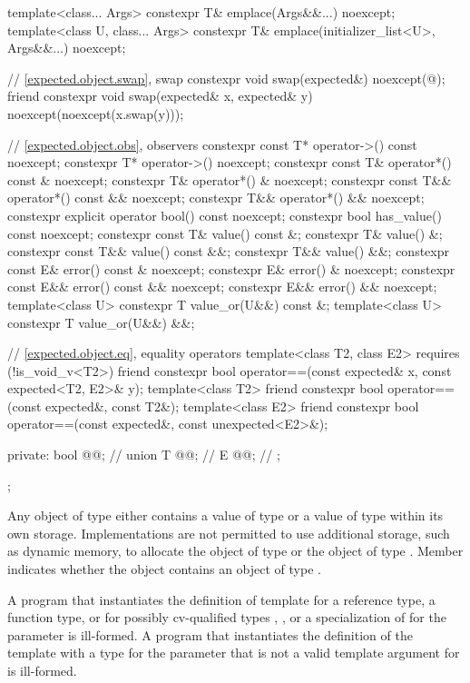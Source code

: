 \begin{codeblock}
{{    template<class... Args>
      constexpr T& emplace(Args&&...) noexcept;
    template<class U, class... Args>
      constexpr T& emplace(initializer_list<U>, Args&&...) noexcept;

    // \ref{expected.object.swap}, swap
    constexpr void swap(expected&) noexcept(@\seebelow@);
    friend constexpr void swap(expected& x, expected& y) noexcept(noexcept(x.swap(y)));

    // \ref{expected.object.obs}, observers
    constexpr const T* operator->() const noexcept;
    constexpr T* operator->() noexcept;
    constexpr const T& operator*() const & noexcept;
    constexpr T& operator*() & noexcept;
    constexpr const T&& operator*() const && noexcept;
    constexpr T&& operator*() && noexcept;
    constexpr explicit operator bool() const noexcept;
    constexpr bool has_value() const noexcept;
    constexpr const T& value() const &;
    constexpr T& value() &;
    constexpr const T&& value() const &&;
    constexpr T&& value() &&;
    constexpr const E& error() const & noexcept;
    constexpr E& error() & noexcept;
    constexpr const E&& error() const && noexcept;
    constexpr E&& error() && noexcept;
    template<class U> constexpr T value_or(U&&) const &;
    template<class U> constexpr T value_or(U&&) &&;

    // \ref{expected.object.eq}, equality operators
    template<class T2, class E2> requires (!is_void_v<T2>)
      friend constexpr bool operator==(const expected& x, const expected<T2, E2>& y);
    template<class T2>
      friend constexpr bool operator==(const expected&, const T2&);
    template<class E2>
      friend constexpr bool operator==(const expected&, const unexpected<E2>&);

  private:
    bool @@;       // \expos
    union {
      T @@;            // \expos
      E @@;           // \expos
    };
  };
}
\end{codeblock}

\pnum
Any object of type  either
contains a value of type  or
a value of type  within its own storage.
Implementations are not permitted to use additional storage,
such as dynamic memory,
to allocate the object of type  or the object of type .
Member  indicates whether the  object
contains an object of type .

\pnum
A program
that instantiates the definition of template 
for a reference type, a function type, or
for possibly cv-qualified types , , or
a specialization of  for the  parameter
is ill-formed.
A program that instantiates
the definition of the template 
with a type for the  parameter
that is not a valid template argument for  is ill-formed.

